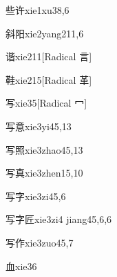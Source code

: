 \begin{verbete}{些许}{xie1xu3}{8,6}
\end{verbete}

\begin{verbete}{斜阳}{xie2yang2}{11,6}
\end{verbete}

\begin{verbete}{谐}{xie2}{11}[Radical 言]
\end{verbete}

\begin{verbete}{鞋}{xie2}{15}[Radical 革]
\end{verbete}

\begin{verbete}{写}{xie3}{5}[Radical 冖]
\end{verbete}

\begin{verbete}{写意}{xie3yi4}{5,13}
\end{verbete}

\begin{verbete}{写照}{xie3zhao4}{5,13}
\end{verbete}

\begin{verbete}{写真}{xie3zhen1}{5,10}
\end{verbete}

\begin{verbete}{写字}{xie3zi4}{5,6}
\end{verbete}

\begin{verbete}{写字匠}{xie3zi4 jiang4}{5,6,6}
\end{verbete}

\begin{verbete}{写作}{xie3zuo4}{5,7}
\end{verbete}

\begin{verbete}{血}{xie3}{6}
\end{verbete}

